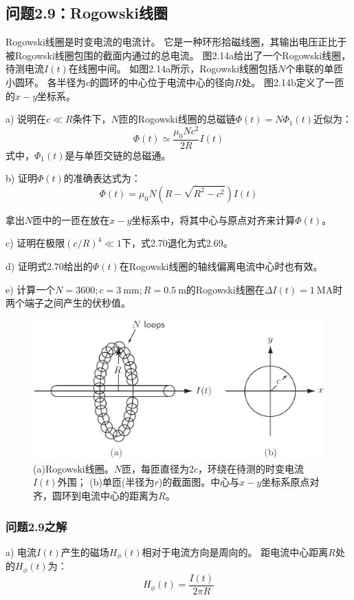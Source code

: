 \subsection{问题2.9：Rogowski线圈}
Rogowski线圈是时变电流的电流计。
它是一种环形拾磁线圈，其输出电压正比于被Rogowski线圈包围的截面内通过的总电流。
图2.14a给出了一个Rogowski线圈，待测电流$I(t)$在线圈中间。
如图2.14a所示，Rogowski线圈包括$N$个串联的单匝小圆环。
各半径为$c$的圆环的中心位于电流中心的径向$R$处。
图2.14b定义了一匝的$x-y$坐标系。

a) 说明在$c\ll R$条件下，$N$匝的Rogowski线圈的总磁链$\Phi(t)=N\Phi_1(t)$近似为：
\begin{equation}
\Phi(t)\simeq\frac{\mu_0 N c^2}{2R}I(t)
\end{equation}
式中，$\Phi_1(t)$是与单匝交链的总磁通。

b) 证明$\Phi(t)$的准确表达式为：
\begin{equation}
\Phi(t)=\mu_0 N (R-\sqrt{R^2-c^2})I(t)
\end{equation}

拿出$N$匝中的一匝在放在$x-y$坐标系中，将其中心与原点对齐来计算$\Phi(t)$。

c) 证明在极限$(c/R)^4\ll 1$下，式2.70退化为式2.69。

d) 证明式2.70给出的$\Phi(t)$在Rogowski线圈的轴线偏离电流中心时也有效。

e) 计算一个$N = 3600; c = 3\ \mathrm{mm}; R = 0.5\ \mathrm{m}$的Rogowski线圈在$\Delta I(t)=1\ \mathrm{MA}$时两个端子之间产生的伏秒值。

\begin{figure}[htbp]
  \centering
 \includegraphics[scale=0.4]{chpt2/figs/fig2.14.eps}
  \caption{(a)Rogowski线圈。$N$匝，每匝直径为$2c$，环绕在待测的时变电流$I(t)$外围；
  (b)单匝(半径为$r$)的截面图。中心与$x-y$坐标系原点对齐，圆环到电流中心的距离为$R$。}
\end{figure}

\subsubsection{问题2.9之解}
a) 电流$I(t)$产生的磁场$H_\phi (t)$相对于电流方向是周向的。
距电流中心距离$R$处的$H_\phi(t)$为：
\begin{equation*}
H_\phi (t)=\frac{I(t)}{2\pi R} \tag{S9.1}
\end{equation*}

